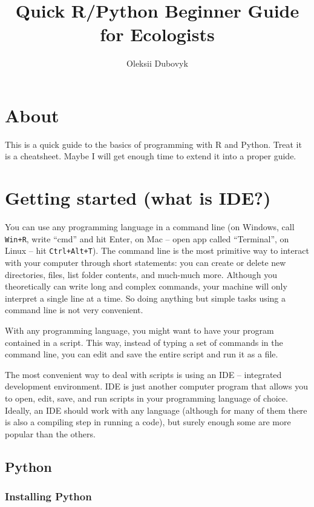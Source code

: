 \documentclass[
  11pt,
]{article}
\title{Quick R/Python Beginner Guide for Ecologists}
\author{Oleksii Dubovyk}
\date{}
\begin{document}
\maketitle

{
\setcounter{tocdepth}{2}
\tableofcontents
}
\section*{About}\label{about}

This is a quick guide to the basics of programming with R and Python. Treat it is a cheatsheet. Maybe I will get enough time to extend it into a proper guide.

\section{Getting started (what is IDE?)}\label{getting-started-what-is-ide}

You can use any programming language in a command line (on Windows, call \texttt{Win+R}, write ``cmd'' and hit Enter, on Mac -- open app called ``Terminal'', on Linux -- hit \texttt{Ctrl+Alt+T}). The command line is the most primitive way to interact with your computer through short statements: you can create or delete new directories, files, list folder contents, and much-much more. Although you theoretically can write long and complex commands, your machine will only interpret a single line at a time. So doing anything but simple tasks using a command line is not very convenient.

With any programming language, you might want to have your program contained in a script. This way, instead of typing a set of commands in the command line, you can edit and save the entire script and run it as a file.

The most convenient way to deal with scripts is using an IDE -- integrated development environment. IDE is just another computer program that allows you to open, edit, save, and run scripts in your programming language of choice. Ideally, an IDE should work with any language (although for many of them there is also a compiling step in running a code), but surely enough some are more popular than the others.

\subsection{Python}\label{python}

\subsubsection{Installing Python}\label{installing-python}
\end{document}
